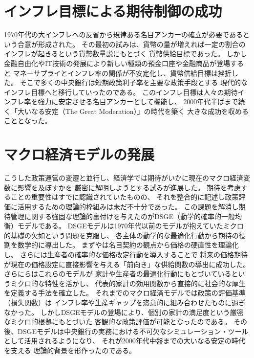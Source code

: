\section{インフレ目標による期待制御の成功}
\label{sec:review_success_of_inflation_targeting}
1970年代の大インフレへの反省から規律ある名目アンカーの確立が必要であるという合意が形成された。
その最初の試みは、貨幣の量が増えれば一定の割合のインフレが起きるという貨幣数量説にもとづく
貨幣供給目標であった。
しかし金融自由化やIT技術の発展により新しい種類の預金口座や金融商品が登場すると
マネーサプライとインフレ率の関係が不安定化し、貨幣供給目標は挫折した。
そこで多くの中央銀行は短期政策利子率を主要な政策手段とする
現代的なインフレ目標へと移行していったのである\parencite{Mishkin1999}。
このインフレ目標は人々の期待インフレ率を強力に安定させる名目アンカーとして機能し、
2000年代半ばまで続く「大いなる安定（The Great Moderation）」\parencite{Bernanke2004}の時代を築く
大きな成功を収めることとなった。

\section{マクロ経済モデルの発展}
\label{sec:review_macro_model_development}
こうした政策運営の変遷と並行し、経済学では期待がいかに現在のマクロ経済変数に影響を及ぼすかを
厳密に解明しようとする試みが進展した。
期待を考慮することの重要性はすでに認識されていたものの、
それを整合的に記述し政策評価に活用するための理論的枠組みは未だ不十分であった。
この課題を解消し期待管理に関する強固な理論的裏付けを与えたのがDSGE（動学的確率的一般均衡）モデルである。
DSGEモデルは1970年代以前のモデルが抱えていたミクロ的基礎の欠如という問題を克服し、
各主体の動学的な最適化行動から期待の役割を数学的に導出した。
まず\textcite{Fischer1977}や\textcite{Taylor1980}は名目契約の観点から価格の硬直性を理論化し、
さらに\textcite{Calvo1983}は生産者の確率的な価格改定行動を導入することで
将来の価格期待が現在の価格設定に直接影響を与える「前向き」な供給関数の導出に成功した。
さらに\textcite{Woodford2003}らはこれらのモデルが
家計や生産者の最適化行動にもとづいているというミクロ的な特性を活かし、
代表的家計の効用関数から直接的に社会的な厚生を定義する手法を確立した。
それまでのマクロ経済モデルでは政策の評価基準（損失関数）は
インフレ率や生産ギャップを恣意的に組み合わせたものに過ぎなかった。
しかしDSGEモデルの登場により、個別の家計の満足度という厳密なミクロ的根拠にもとづいた
客観的な政策評価が可能となったのである。
その後、DSGEモデルは中央銀行の実務における不可欠なシミュレーション・ツールとして活用されるようになり、
それが2000年代中盤までの大いなる安定の時代を支える
理論的背景を形作ったのである。

